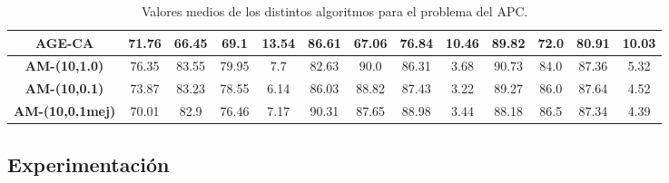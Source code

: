 \documentclass[11pt,a4paper]{article}
\begin{document}
\begin{table}[H]
{\begin{tabular}{c|c|c|c|c|c|c|c|c|c|c|c|c|}
\multicolumn{1}{|c|}{\textbf{AGE-CA}}         & 71.76             & 66.45                   & 69.1          & 13.54      & 86.61             & 67.06          & 76.84         & 10.46      & 89.82             & 72.0           & 80.91         & 10.03      \\ \hline
\multicolumn{1}{|c|}{\textbf{AM-(10,1.0)}}    & 76.35             & 83.55                   & 79.95         & 7.7        & 82.63             & 90.0           & 86.31         & 3.68       & 90.73             & 84.0           & 87.36         & 5.32       \\ \hline
\multicolumn{1}{|c|}{\textbf{AM-(10,0.1)}}    & 73.87             & 83.23                   & 78.55         & 6.14       & 86.03             & 88.82          & 87.43         & 3.22       & 89.27             & 86.0           & 87.64         & 4.52       \\ \hline
\multicolumn{1}{|c|}{\textbf{AM-(10,0.1mej)}} & 70.01             & 82.9                    & 76.46         & 7.17       & 90.31             & 87.65          & 88.98         & 3.44       & 88.18             & 86.5           & 87.34         & 4.39       \\ \hline
\end{tabular}
}%
\caption{Valores medios de los distintos algoritmos para el problema del APC.}
\end{table}

\subsection{Experimentación}
\end{document}
